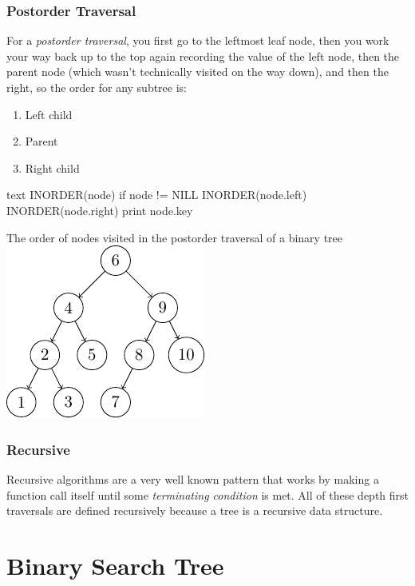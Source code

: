 \subsubsection{Postorder Traversal}\label{ssub:postorder_traversal}

For a \emph{postorder traversal}, you first go to the leftmost leaf node, then you work your way back up to the top again recording the value of the left node, then the parent node (which wasn't technically visited on the way down), and then the right, so the order for any subtree is:
\begin{enumerate}
    \item Left child
    \item Parent
    \item Right child
\end{enumerate}
\begin{code}{text}
    INORDER(node)
        if node != NILL
            INORDER(node.left)
            INORDER(node.right)
            print node.key
\end{code}

\begin{highlight}{The order of nodes visited in the postorder traversal of a binary tree}
    \includegraphics{lualatex/pa/8/postordertraversal.pdf}
\end{highlight}

\subsubsection{Recursive}\label{ssub:recursivetreetraversal}

Recursive algorithms are a very well known pattern that works by making a function call itself until some \emph{terminating condition} is met.
All of these depth first traversals are defined recursively because a tree is a recursive data structure.

\section{Binary Search Tree}\label{sec:binary_search_tree_operations}

